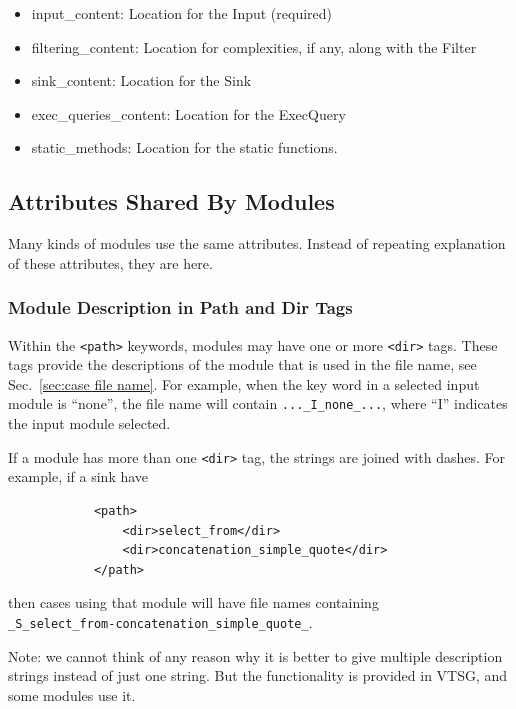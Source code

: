\documentclass[12pt]{article}
\begin{document}
\begin{itemize}
\begin{itemize}
        \item input\_content:  Location for the Input (required)

        \item filtering\_content:  Location for complexities, if any, along
        with the Filter

        \item sink\_content:  Location for the Sink

        \item exec\_queries\_content:  Location for the ExecQuery

        \item static\_methods:  Location for the static functions.
    \end{itemize}
\end{itemize}


\subsection{Attributes Shared By Modules}
\label{sec:shared attributes}

Many kinds of modules use the same attributes.  Instead of repeating explanation of
these attributes, they are here.

\subsubsection{Module Description in Path and Dir Tags}
\label{sec:module description}

Within the \verb|<path>| keywords, modules may have one or more \verb|<dir>| tags.
These tags provide the descriptions of the module that is used in the file name, see
Sec.~\ref{sec:case file name}.  For example, when the key word in a selected input
module is ``none'', the file name will contain \verb|..._I_none_...|, where ``I''
indicates the input module selected.

If a module has more than one \verb|<dir>| tag, the strings are joined with dashes.
For example, if a sink have
\begin{verbatim}
            <path>
                <dir>select_from</dir>
                <dir>concatenation_simple_quote</dir>
            </path>
\end{verbatim}
then cases using that module will have file names containing \\
\verb|_S_select_from-concatenation_simple_quote_|.

Note: we cannot think of any reason why it is better to give multiple description
strings instead of just one string.  But the functionality is provided in VTSG, and
some modules use it.
\end{document}
